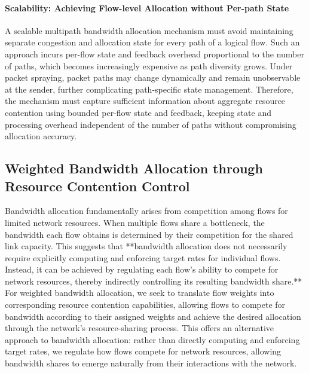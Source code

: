 \paragraph{Scalability: Achieving Flow-level Allocation without Per-path State}
A scalable multipath bandwidth allocation mechanism must avoid maintaining separate congestion and allocation state for every path of a logical flow. Such an approach incurs per-flow state and feedback overhead proportional to the number of paths, which becomes increasingly expensive as path diversity grows. Under packet spraying, packet paths may change dynamically and remain unobservable at the sender, further complicating path-specific state management. Therefore, the mechanism must capture sufficient information about aggregate resource contention using bounded per-flow state and feedback, keeping state and processing overhead independent of the number of paths without compromising allocation accuracy.


\subsection{Weighted Bandwidth Allocation through Resource Contention Control}

Bandwidth allocation fundamentally arises from competition among flows for limited network resources. When multiple flows share a bottleneck, the bandwidth each flow obtains is determined by their competition for the shared link capacity. This suggests that **bandwidth allocation does not necessarily require explicitly computing and enforcing target rates for individual flows. Instead, it can be achieved by regulating each flow's ability to compete for network resources, thereby indirectly controlling its resulting bandwidth share.** For weighted bandwidth allocation, we seek to translate flow weights into corresponding resource contention capabilities, allowing flows to compete for bandwidth according to their assigned weights and achieve the desired allocation through the network's resource-sharing process. This offers an alternative approach to bandwidth allocation: rather than directly computing and enforcing target rates, we regulate how flows compete for network resources, allowing bandwidth shares to emerge naturally from their interactions with the network.

